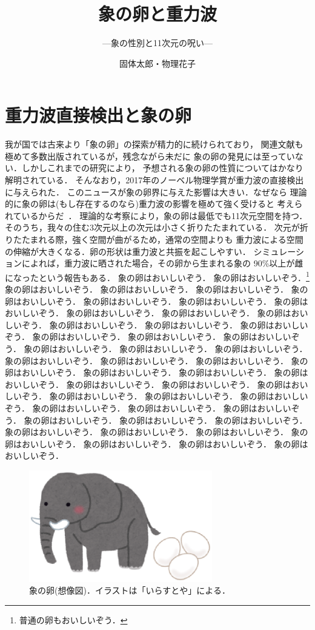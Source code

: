 \documentclass[kaisetsu,b5paper,papersize,twocolumn]{jsarticle}
\title{象の卵と重力波}
\subtitle{---象の性別と11次元の呪い---}
\author{固体太郎・物理花子}
\affiliation{国立象卵研究所附属文書作成施設}
\begin{document}
\maketitle

\section{重力波直接検出と象の卵}

我が国では古来より「象の卵」の探索が精力的に続けられており，
関連文献も極めて多数出版されているが，残念ながら未だに
象の卵の発見には至っていない．しかしこれまでの研究により，
予想される象の卵の性質についてはかなり解明されている．
そんなおり，2017年のノーベル物理学賞が重力波の直接検出に与えられた．
このニュースが象の卵界に与えた影響は大きい．なぜなら
理論的に象の卵は(もし存在するのなら)重力波の影響を極めて強く受けると
考えられているからだ~\cite{elephant}．
理論的な考察により，象の卵は最低でも11次元空間を持つ．
そのうち，我々の住む3次元以上の次元は小さく折りたたまれている．
次元が折りたたまれる際，強く空間が曲がるため，通常の空間よりも
重力波による空間の伸縮が大きくなる．卵の形状は重力波と共振を起こしやすい．
シミュレーションによれば，重力波に晒された場合，その卵から生まれる象の
90\%以上が雌になったという報告もある．
象の卵はおいしいぞう．
象の卵はおいしいぞう．\footnote{%
普通の卵もおいしいぞう．
}
象の卵はおいしいぞう．
象の卵はおいしいぞう．
象の卵はおいしいぞう．
象の卵はおいしいぞう．
象の卵はおいしいぞう．
象の卵はおいしいぞう．
象の卵はおいしいぞう．
象の卵はおいしいぞう．
象の卵はおいしいぞう．
象の卵はおいしいぞう．
象の卵はおいしいぞう．
象の卵はおいしいぞう．
象の卵はおいしいぞう．
象の卵はおいしいぞう．
象の卵はおいしいぞう．
象の卵はおいしいぞう．
象の卵はおいしいぞう．
象の卵はおいしいぞう．
象の卵はおいしいぞう．
象の卵はおいしいぞう．
象の卵はおいしいぞう．
象の卵はおいしいぞう．
象の卵はおいしいぞう．
象の卵はおいしいぞう．
象の卵はおいしいぞう．
象の卵はおいしいぞう．
象の卵はおいしいぞう．
象の卵はおいしいぞう．
象の卵はおいしいぞう．
象の卵はおいしいぞう．
象の卵はおいしいぞう．
象の卵はおいしいぞう．
象の卵はおいしいぞう．
象の卵はおいしいぞう．
象の卵はおいしいぞう．
象の卵はおいしいぞう．
象の卵はおいしいぞう．
象の卵はおいしいぞう．
象の卵はおいしいぞう．
象の卵はおいしいぞう．
象の卵はおいしいぞう．
象の卵はおいしいぞう．
象の卵はおいしいぞう．
象の卵はおいしいぞう．
象の卵はおいしいぞう．
\begin{figure}[tb]
\centering
\includegraphics[width=8cm]{eggphant.eps}
\caption{象の卵(想像図)．イラストは「いらすとや」による．}
\label{fig_eggphant}
\end{figure}
\end{document}
